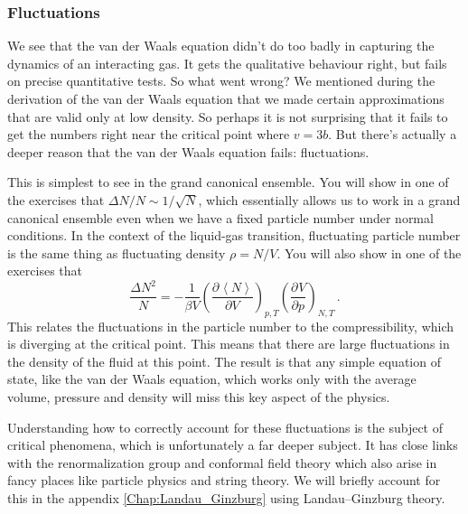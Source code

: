 \documentclass{article}
\theoremstyle{plain}\theoremheaderfont{\normalfont\bfseries}\theorembodyfont{\rmfamily}\theoremseparator{.}\newtheorem*{thm}{Theorem}\newtheorem*{law}{Law}\newtheorem*{pos}{Postulate}
\numberwithin{equation}{section}
\newcommand{\pdv}[3][]{\frac{\partial^{#1} #2}{{\partial #3}^{#1}}}
\newcommand{\eval}[1]{\left\langle #1 \right\rangle}
\begin{document}
    \subsubsection*{Fluctuations}
    We see that the van der Waals equation didn't do too badly in capturing the dynamics of an interacting gas. It gets the qualitative behaviour right, but fails on precise quantitative tests. So what went wrong? We mentioned during the derivation of the van der Waals equation that we made certain approximations that are valid only at low density. So perhaps it is not surprising that it fails to get the numbers right near the critical point where \(v=3b\). But there's actually a deeper reason that the van der Waals equation fails: fluctuations.

    This is simplest to see in the grand canonical ensemble. You will show in one of the exercises that \(\Delta N/N\sim 1/\sqrt{N}\), which essentially allows us to work in a grand canonical ensemble even when we have a fixed particle number under normal conditions. In the context of the liquid-gas transition, fluctuating particle number is the same thing as fluctuating density \(\rho=N/V\). You will also show in one of the exercises that
    \begin{equation}
        \frac{\Delta N^2}{N}=-\frac{1}{\beta V}\left(\pdv{\eval{N}}{V}\right)_{p,T}\left(\pdv{V}{p}\right)_{N,T}\,.
    \end{equation}
    This relates the fluctuations in the particle number to the compressibility, which is diverging at the critical point. This means that there are large fluctuations in the density of the fluid at this point. The result is that any simple equation of state, like the van der Waals equation, which works only with the average volume, pressure and density will miss this key aspect of the physics.

    Understanding how to correctly account for these fluctuations is the subject of critical phenomena, which is unfortunately a far deeper subject. It has close links with the renormalization group and conformal field theory which also arise in fancy places like particle physics and string theory. We will briefly account for this in the appendix \cref{Chap:Landau_Ginzburg} using Landau--Ginzburg theory.
\end{document}
